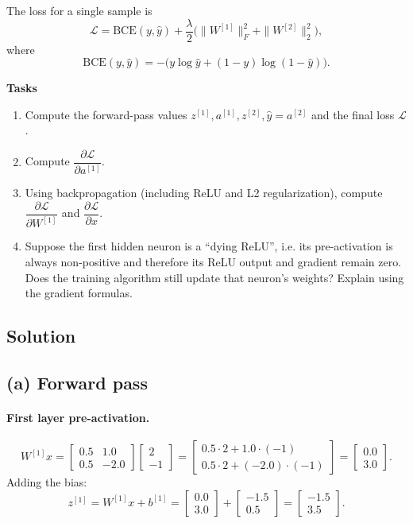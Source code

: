 \documentclass{article}
\begin{document}
The loss for a single sample is
\[
\mathcal{L} = \mathrm{BCE}(y,\hat y) + \frac{\lambda}{2}
\big(\|W^{[1]}\|_F^2 + \|W^{[2]}\|_2^2\big),
\]
where
\[
\mathrm{BCE}(y,\hat y) = -\Big(y\log\hat y + (1-y)\log(1-\hat y)\Big).
\]

\textbf{Tasks}
\begin{enumerate}
	\item[(a)] Compute the forward-pass values $z^{[1]}, a^{[1]}, z^{[2]}, \hat y = a^{[2]}$ and the final loss $\mathcal{L}$.
	\item[(b)] Compute $\dfrac{\partial\mathcal{L}}{\partial a^{[1]}}$.
	\item[(c)] Using backpropagation (including ReLU and L2 regularization), compute
	$\dfrac{\partial\mathcal{L}}{\partial W^{[1]}}$ and $\dfrac{\partial\mathcal{L}}{\partial x}$.
	\item[(d)] Suppose the first hidden neuron is a ``dying ReLU'', i.e. its pre-activation is always non-positive and therefore its ReLU output and gradient remain zero. Does the training algorithm still update that neuron’s weights? Explain using the gradient formulas.
\end{enumerate}

\subsection*{Solution}

\subsection{(a) Forward pass}

\paragraph{First layer pre-activation.}
\[
W^{[1]}x =
\begin{bmatrix}
0.5 & 1.0\\
0.5 & -2.0
\end{bmatrix}
\begin{bmatrix}
2\\
-1
\end{bmatrix}
=
\begin{bmatrix}
0.5\cdot 2 + 1.0\cdot(-1)\\
0.5\cdot 2 + (-2.0)\cdot(-1)
\end{bmatrix}
=
\begin{bmatrix}
0.0\\
3.0
\end{bmatrix}.
\]
Adding the bias:
\[
z^{[1]} = W^{[1]}x + b^{[1]} =
\begin{bmatrix}
0.0\\
3.0
\end{bmatrix}
+
\begin{bmatrix}
-1.5\\
0.5
\end{bmatrix}
=
\begin{bmatrix}
-1.5\\
3.5
\end{bmatrix}.
\]
\end{document}
